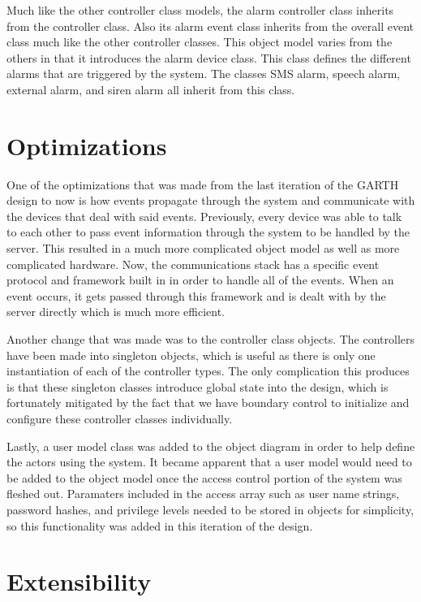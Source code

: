 \documentclass{report}
\begin{document}
Much like the other controller class models, the alarm controller class
inherits from the controller class. Also its alarm event class inherits from
the overall event class much like the other controller classes. This object
model varies from the others in that it introduces the alarm device class. This
class defines the different alarms that are triggered by the system. The
classes SMS alarm, speech alarm, external alarm, and siren alarm all inherit
from this class.

\section{Optimizations}

One of the optimizations that was made from the last iteration of the GARTH
design to now is how events propagate through the system and communicate with
the devices that deal with said events. Previously, every device was able to
talk to each other to pass event information through the system to be handled by
the server. This resulted in a much more complicated object model as well as
more complicated hardware. Now, the communications stack has a specific event
protocol and framework built in in order to handle all of the events. When an 
event occurs, it gets passed through this framework and is dealt with by the
server directly which is much more efficient.

Another change that was made was to the controller class objects. The controllers
have been made into singleton objects, which is useful as there is only one
instantiation of each of the controller types. The only complication this produces
is that these singleton classes introduce global state into the design, which
is fortunately mitigated by the fact that we have boundary control to initialize
and configure these controller classes individually. 

Lastly, a user model class was added to the object diagram in order to help
define the actors using the system. It became apparent that a user model would
need to be added to the object model once the access control portion of the 
system was fleshed out. Paramaters included in the access array such as user
name strings, password hashes, and privilege levels needed to be stored in
objects for simplicity, so this functionality was added in this iteration of the
design.

\section{Extensibility}
\end{document}
